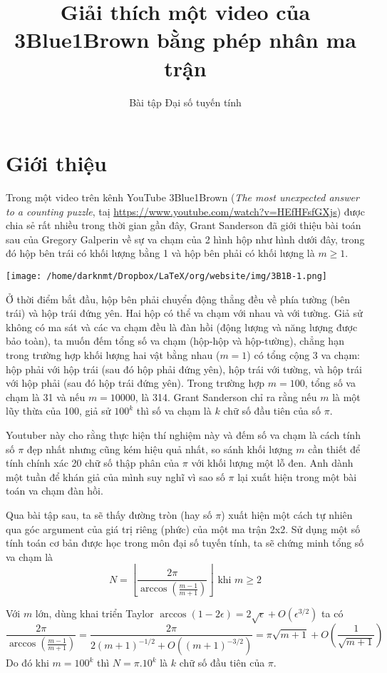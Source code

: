 \documentclass[11pt]{article}
\author{Bài tập Đại số tuyến tính}
\title{Giải thích một video của 3Blue1Brown bằng phép nhân ma trận}
\begin{document}
\maketitle
\section*{Giới thiệu}
\label{sec:orgc6dd89a}
Trong một video trên kênh YouTube 3Blue1Brown (\emph{The most unexpected answer to a counting puzzle}, taị
\url{https://www.youtube.com/watch?v=HEfHFsfGXjs}) được chia sẻ rất nhiều trong thời gian gần
đây, Grant Sanderson đã giới thiệu bài toán sau của Gregory
Galperin về sự va chạm của 2 hình hộp như hình dưới đây, trong đó hộp bên trái có khối
lượng bằng 1 và hộp bên phải có khối lượng là \(m \geq 1\).
\begin{center}
\texttt{[image: /home/darknmt/Dropbox/LaTeX/org/website/img/3B1B-1.png]}
\end{center}

Ở thời điểm bắt đầu, hộp bên phải chuyển động thẳng đều về phía tường (bên trái) và hộp trái đứng yên. Hai hộp
có thể va chạm với nhau và với tường. Giả sử không có ma sát và các va chạm đều
là đàn hồi (động lượng và năng lượng được bảo toàn), ta muốn đếm tổng số va chạm (hộp-hộp và
hộp-tường), chẳng hạn trong trường hợp khối lượng hai vật bằng nhau (\(m=1\)) có tổng
cộng 3 va chạm: hộp phải với hộp trái (sau đó hộp phải đứng yên), hộp trái với tường, và
hộp trái với hộp phải (sau đó hộp trái đứng yên). Trong trường hợp \(m=100\), tổng số va chạm
là 31 và nếu \(m=10000\), là 314. Grant Sanderson chỉ ra rằng nếu \(m\) là một lũy thừa của 100, giả sử \(100^k\) thì
số va chạm là \(k\) chữ số đầu tiên của số \(\pi\).

Youtuber này cho rằng thực hiện thí nghiệm này và đếm số va chạm là cách tính số \(\pi\)
đẹp nhất nhưng cũng kém hiệu quả nhất, so sánh khối lượng \(m\) cần thiết để
tính chính xác 20 chữ số thập phân của \(\pi\) với khối lượng một lỗ đen. Anh dành một
tuần để khán giả của mình suy nghĩ vì sao số \(\pi\) lại xuất hiện trong một bài toán va chạm đàn hồi.

Qua bài tập
sau, ta sẽ thấy đường tròn (hay số \(\pi\)) xuất hiện một cách tự nhiên qua góc argument của
giá trị riêng (phức) của một ma trận 2x2. Sử dụng một số
tính toán cơ bản được học trong môn đại số tuyến tính, ta sẽ chứng minh tổng số va chạm là
\[
N = \left \lfloor \frac{2\pi}{\arccos(\frac{m-1}{m+1})}\right\rfloor \text{ khi } m\geq 2
\]

Với \(m\) lớn, dùng khai triển Taylor \(\arccos(1 - 2\epsilon) = 2\sqrt{\epsilon} +
O(\epsilon^{3/2})\) ta có 
\[ 
\frac{2\pi}{\arccos(\frac{m-1}{m+1})} = \frac{2\pi}{2(m+1)^{-1/2} + O((m+1)^{-3/2})}=
\pi\sqrt{m+1} + O(\frac{1}{\sqrt{m+1}})  
\]
Do đó khi \(m=100^k\) thì \(N = \pi .10^k\) là \(k\) chữ số đầu tiên của \(\pi\).
\end{document}
